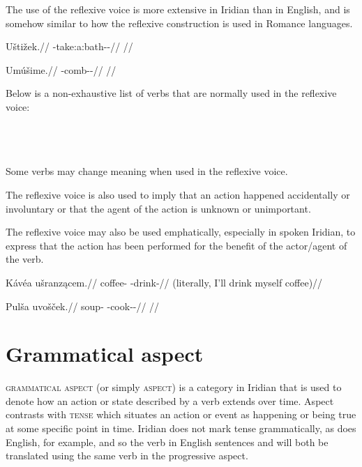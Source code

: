 The use of the reflexive voice is more extensive in Iridian than in
English, and is somehow similar to how the reflexive construction
is used in Romance languages.

\pex
\begingl
\gla Uštižek.//
\glb \Refl{}-take:a:bath-\Av{}-\Pf{}//
\glft {}//
\endgl
\xe

\pex
\begingl
\gla Umúšime.//
\glb \Refl{}-comb-\Av{}-\Prog{}//
\glft {}//
\endgl
\xe

Below is a non-exhaustive list of verbs that are normally used in the reflexive
voice:
\bigskip

\noindent
{} \\
 \\
 \\

Some verbs may change meaning when used in the reflexive voice.


The reflexive voice is also used to imply that an action happened accidentally
or involuntary or that the agent of the action is unknown or unimportant.

The reflexive voice may also be used emphatically, especially in spoken Iridian,
to express that the action has been performed for the benefit of the actor/agent
of the verb.

\pex
\begingl
\gla Kávéa ušranz\k{a}cem.//
\glb coffee-\Acc{} \Refl{}-drink-//
\glft {} (literally, I'll drink myself coffee)//
\endgl
\xe

\pex
\begingl
\gla Pulša uvošček.//
\glb soup-\Acc{} \Refl{}-cook-\Av{}-\Pf{}//
\glft {}//
\endgl
\xe

\section{Grammatical aspect}\label{sec:aspect}

{\scshape grammatical aspect} (or simply {\scshape aspect}) is a category in
Iridian that is used to denote how an action or state described by a verb
extends over time. Aspect contrasts with {\scshape tense} which situates an
action or event as happening or being true at some specific point in time.
Iridian does not mark tense grammatically, as does English, for
example, and so the verb in English sentences  and  will both be
translated using the same verb in the progressive aspect. 

